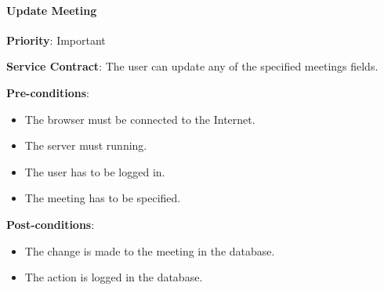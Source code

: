     	\paragraph{Update Meeting}
			\begin{description}
			    \item{\textbf{Priority}:} Important
			    \item{\textbf{Service Contract}:} The user can update any of the specified meetings fields.
			    \item{\textbf{Pre-conditions}:}
    			    \begin{itemize}
    			        \item The browser must be connected to the Internet.
    			        \item The server must running.
    			        \item The user has to be logged in. 
    			        \item The meeting has to be specified.
    			    \end{itemize}
			    \item{\textbf{Post-conditions}:} 
    			    \begin{itemize}
    			      \item The change is made to the meeting in the database.
    			      \item The action is logged in the database.
    			    \end{itemize}
			\end{description}	
	    
